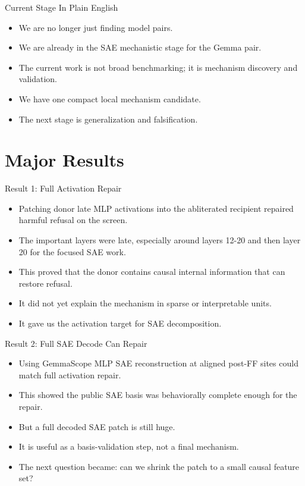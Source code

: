 \documentclass[aspectratio=169]{beamer}
\begin{document}
\begin{frame}{Current Stage In Plain English}
\small
\begin{itemize}
  \item We are no longer just finding model pairs.
  \item We are already in the SAE mechanistic stage for the Gemma pair.
  \item The current work is not broad benchmarking; it is mechanism discovery and validation.
  \item We have one compact local mechanism candidate.
  \item The next stage is generalization and falsification.
\end{itemize}
\end{frame}

\section{Major Results}

\begin{frame}{Result 1: Full Activation Repair}
\small
\begin{itemize}
  \item Patching donor late MLP activations into the abliterated recipient repaired harmful refusal on the screen.
  \item The important layers were late, especially around layers 12-20 and then layer 20 for the focused SAE work.
  \item This proved that the donor contains causal internal information that can restore refusal.
  \item It did not yet explain the mechanism in sparse or interpretable units.
  \item It gave us the activation target for SAE decomposition.
\end{itemize}
\end{frame}

\begin{frame}{Result 2: Full SAE Decode Can Repair}
\small
\begin{itemize}
  \item Using GemmaScope MLP SAE reconstruction at aligned post-FF sites could match full activation repair.
  \item This showed the public SAE basis was behaviorally complete enough for the repair.
  \item But a full decoded SAE patch is still huge.
  \item It is useful as a basis-validation step, not a final mechanism.
  \item The next question became: can we shrink the patch to a small causal feature set?
\end{itemize}
\end{frame}
\end{document}

